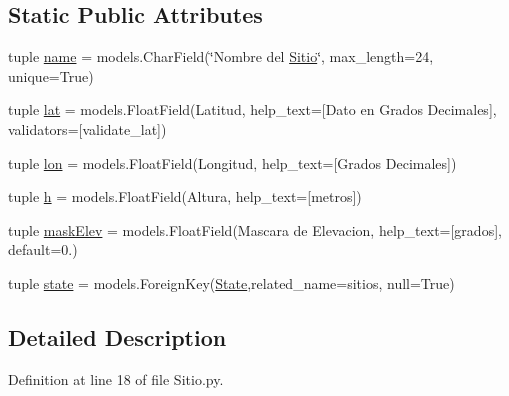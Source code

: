 \subsection*{Static Public Attributes}
\begin{DoxyCompactItemize}
\item 
tuple \hyperlink{class_ground_segment_1_1models_1_1_sitio_1_1_sitio_ad9bfe4bfea9a9a600a9cf0a17dfe2abf}{name} = models.\+Char\+Field(\char`\"{}Nombre del \hyperlink{class_ground_segment_1_1models_1_1_sitio_1_1_sitio}{Sitio}\char`\"{}, max\+\_\+length=24, unique=True)
\item 
tuple \hyperlink{class_ground_segment_1_1models_1_1_sitio_1_1_sitio_a981bccda8fdc7772f7ce19d23e3c6bd7}{lat} = models.\+Float\+Field(\textquotesingle{}Latitud\textquotesingle{}, help\+\_\+text=\textquotesingle{}\mbox{[}Dato en Grados Decimales\mbox{]}\textquotesingle{}, validators=\mbox{[}validate\+\_\+lat\mbox{]})
\item 
tuple \hyperlink{class_ground_segment_1_1models_1_1_sitio_1_1_sitio_a58939f0d8d5fff5d4807f745c6ba3335}{lon} = models.\+Float\+Field(\textquotesingle{}Longitud\textquotesingle{}, help\+\_\+text=\textquotesingle{}\mbox{[}Grados Decimales\mbox{]}\textquotesingle{})
\item 
tuple \hyperlink{class_ground_segment_1_1models_1_1_sitio_1_1_sitio_a0345de18d6f8cc930f291c639a915366}{h} = models.\+Float\+Field(\textquotesingle{}Altura\textquotesingle{}, help\+\_\+text=\textquotesingle{}\mbox{[}metros\mbox{]}\textquotesingle{})
\item 
tuple \hyperlink{class_ground_segment_1_1models_1_1_sitio_1_1_sitio_ae26c1d2a62cbe1a3dcae871012c0d5bd}{mask\+Elev} = models.\+Float\+Field(\textquotesingle{}Mascara de Elevacion\textquotesingle{}, help\+\_\+text=\textquotesingle{}\mbox{[}grados\mbox{]}\textquotesingle{}, default=0.)
\item 
tuple \hyperlink{class_ground_segment_1_1models_1_1_sitio_1_1_sitio_a2322dc336db534f7eec708e7e17b732f}{state} = models.\+Foreign\+Key(\hyperlink{class_ground_segment_1_1models_1_1_state_1_1_state}{State},related\+\_\+name=\textquotesingle{}sitios\textquotesingle{}, null=True)
\end{DoxyCompactItemize}


\subsection{Detailed Description}


Definition at line 18 of file Sitio.\+py.



